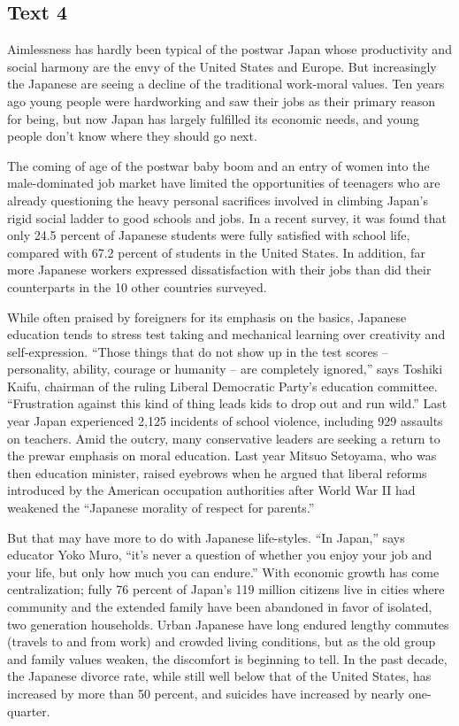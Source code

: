 \subsection{Text 4}
Aimlessness has hardly been typical of the postwar Japan whose productivity and social harmony are the envy of the United States and Europe. But increasingly the Japanese are seeing a decline of the traditional work-moral values. Ten years ago young people were hardworking and saw their jobs as their primary reason for being, but now Japan has largely fulfilled its economic needs, and young people don’t know where they should go next.

The coming of age of the postwar baby boom and an entry of women into the male-dominated job market have limited the opportunities of teenagers who are already questioning the heavy personal sacrifices involved in climbing Japan’s rigid social ladder to good schools and jobs. In a recent survey, it was found that only  24.5 percent of Japanese students were fully satisfied with school life, compared with 67.2 percent of students in the United States. In addition, far more Japanese workers expressed dissatisfaction with their jobs than did their counterparts in the 10 other countries surveyed.

While often praised by foreigners for its emphasis on the basics, Japanese education tends to stress test taking and mechanical learning over creativity and self-expression. “Those things that do not show up in the test scores -- personality, ability, courage or humanity -- are completely ignored,” says Toshiki Kaifu, chairman of the ruling Liberal Democratic Party’s education committee. “Frustration against this kind of thing leads kids to drop out and run wild.” Last year Japan experienced 2,125 incidents of school violence, including 929 assaults on teachers. Amid the outcry, many conservative leaders are seeking a return to the prewar emphasis on moral education. Last year Mitsuo Setoyama, who was then education minister, raised eyebrows when he argued that liberal reforms introduced by the American occupation authorities after World War II had weakened the “Japanese morality of respect for parents.”

But that may have more to do with Japanese life-styles. “In Japan,” says educator Yoko Muro, “it’s never a question of whether you enjoy your job and your life, but only how much you can endure.” With economic growth has come centralization; fully 76 percent of Japan’s 119 million citizens live in cities where community and the extended family have been abandoned in favor of isolated, two generation households. Urban Japanese have long endured lengthy commutes (travels to and from work) and crowded living conditions, but as the old group and family values weaken, the discomfort is beginning to tell. In the past decade, the Japanese divorce rate, while still well below that of the United States, has increased by more than 50 percent, and suicides have increased by nearly one-quarter.

